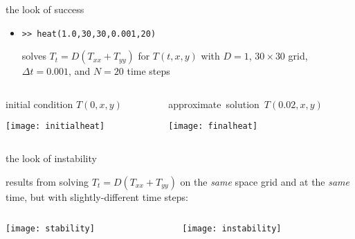 \begin{frame}{the look of success}

\begin{itemize}
\item \texttt{>>  heat(1.0,30,30,0.001,20)}

\medskip
solves $T_t = D(T_{xx} + T_{yy})$ for $T(t,x,y)$ with $D=1$, $30\times 30$ grid, $\Delta t = 0.001$, and $N=20$ time steps
\end{itemize}

\bigskip
\begin{columns}
\begin{column}{0.5\textwidth}
initial condition $T(0,x,y)$

\bigskip
\begin{center}
\texttt{[image: initialheat]}
\end{center}
\end{column}
\begin{column}{0.5\textwidth}
\mbox{approximate solution $T(0.02,x,y)$}

\bigskip
\begin{center}
\texttt{[image: finalheat]}
\end{center}
\end{column}
\end{columns}
\end{frame}


\begin{frame}{the look of instability}

results from solving $T_t = D(T_{xx} + T_{yy})$ on the \emph{same} space grid and at the \emph{same} time, but with slightly-different time steps:

\bigskip
\begin{columns}
\begin{column}{0.5\textwidth}
\begin{center}
\texttt{[image: stability]}

\end{center}
\end{column}
\begin{column}{0.5\textwidth}
\begin{center}
\texttt{[image: instability]}

\end{center}
\end{column}
\end{columns}
\end{frame}


